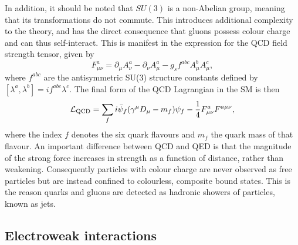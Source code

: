 In addition, it should be noted that $SU(3)$ is a non-Abelian group, 
meaning that its transformations do not commute.
This introduces additional complexity to the theory, 
and has the direct consequence that gluons possess colour charge and can thus self-interact.
This is manifest in the expression for the QCD field strength tensor, given by
\begin{equation}
F^a_{\mu\nu} = \partial_\mu A^a_\nu - \partial_\nu A^a_\mu - g_s f^{abc} A^b_\mu A^c_\mu ,
\end{equation}
where  $f^{abc}$ are the antisymmetric SU(3) structure constants defined by 
$[\lambda^a,\lambda^b] = i f^{abc} \lambda^c$.
The final form of the QCD Lagrangian in the SM is then
\begin{equation}
\mathcal{L}_{\textrm{QCD}} = \sum_{f} i \bar{\psi}_f (\gamma^\mu D_\mu - m_f) \psi_f 
                       - \frac{1}{4} F^a_{\mu\nu} F^{a\mu\nu} ,
\end{equation}
where the index $f$ denotes the six quark flavours and $m_f$ the quark mass of that flavour.
An important difference between QCD and QED is that the magnitude of the strong force 
increases in strength as a function of distance, rather than weakening.
Consequently particles with colour charge are never observed as free particles 
but are instead confined to colourless, composite bound states.
This is the reason quarks and gluons are detected as hadronic showers of particles, 
known as jets.

\subsection{Electroweak interactions}

